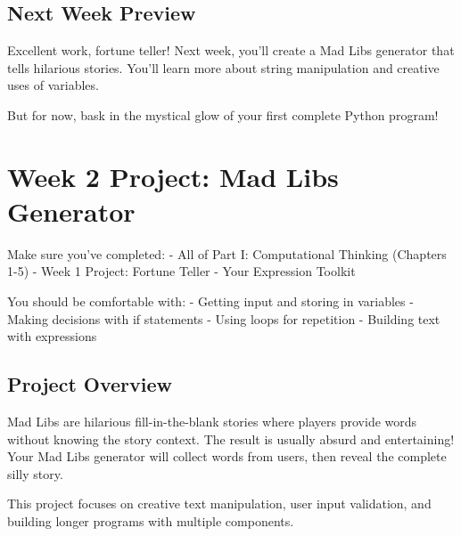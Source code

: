 \documentclass[
  letterpaper,
  DIV=11,
  numbers=noendperiod,
  oneside]{scrreprt}
\begin{document}
\section{Next Week Preview}\label{next-week-preview}

Excellent work, fortune teller! Next week, you'll create a Mad Libs
generator that tells hilarious stories. You'll learn more about string
manipulation and creative uses of variables.

But for now, bask in the mystical glow of your first complete Python
program! 🔮

\chapter{Week 2 Project: Mad Libs Generator}\label{sec-project-mad-libs}

\begin{tcolorbox}[enhanced jigsaw, opacityback=0, colback=white, colframe=quarto-callout-important-color-frame, breakable, titlerule=0mm, coltitle=black, rightrule=.15mm, colbacktitle=quarto-callout-important-color!10!white, left=2mm, bottomtitle=1mm, bottomrule=.15mm, title=\textcolor{quarto-callout-important-color}{\faExclamation}\hspace{0.5em}{Before You Start}, opacitybacktitle=0.6, toptitle=1mm, leftrule=.75mm, arc=.35mm, toprule=.15mm]

Make sure you've completed: - All of Part I: Computational Thinking
(Chapters 1-5) - Week 1 Project: Fortune Teller - Your Expression
Toolkit

You should be comfortable with: - Getting input and storing in variables
- Making decisions with if statements - Using loops for repetition -
Building text with expressions

\end{tcolorbox}

\section{Project Overview}\label{project-overview-1}

Mad Libs are hilarious fill-in-the-blank stories where players provide
words without knowing the story context. The result is usually absurd
and entertaining! Your Mad Libs generator will collect words from users,
then reveal the complete silly story.

This project focuses on creative text manipulation, user input
validation, and building longer programs with multiple components.
\end{document}
